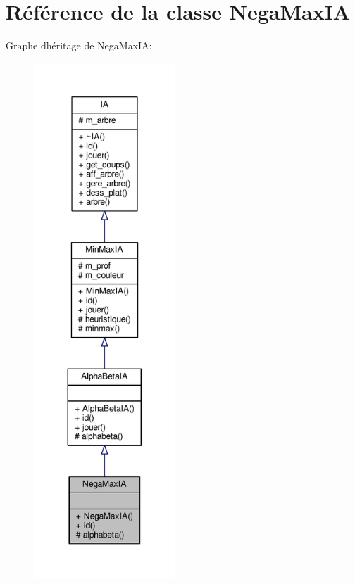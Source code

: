 \hypertarget{classNegaMaxIA}{}\section{Référence de la classe Nega\+Max\+IA}
\label{classNegaMaxIA}


Graphe d\textquotesingle{}héritage de Nega\+Max\+IA\+:\nopagebreak
\begin{figure}[H]
\begin{center}
\leavevmode
\includegraphics[height=550pt]{classNegaMaxIA__inherit__graph}
\end{center}
\end{figure}


